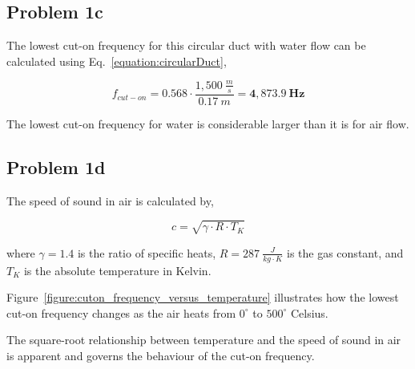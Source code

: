 \subsection*{Problem 1c}

The lowest cut-on frequency for this circular duct with water flow can be calculated using Eq.~\ref{equation:circularDuct},

\vspace{-0.25cm}
\begin{equation*}
    f_{cut-on} = 0.568 \cdot \frac{ 1,500~\frac{m}{s} }{ 0.17~m } = \boldsymbol{4,873.9~Hz}
\end{equation*}

The lowest cut-on frequency for water is considerable larger than it is for air flow.





\newpage
\subsection*{Problem 1d}

The speed of sound in air is calculated by,

\vspace{-0.25cm}
\begin{equation}
    c = \sqrt{ \gamma \cdot R \cdot T_K }
    \label{equation:speedOfSoundInAir}
\end{equation}

where $\gamma = 1.4$ is the ratio of specific heats, $R = 287~\frac{J}{kg \cdot K}$ is the gas constant, and $T_K$ is the absolute temperature in Kelvin.

\vspace{0.25cm}
Figure~\ref{figure:cuton_frequency_versus_temperature} illustrates how the lowest cut-on frequency changes as the air heats from $0^{\circ}$ to $500^{\circ}$ Celsius.

\vspace{0.25cm}
The square-root relationship between temperature and the speed of sound in air is apparent and governs the behaviour of the cut-on frequency.




